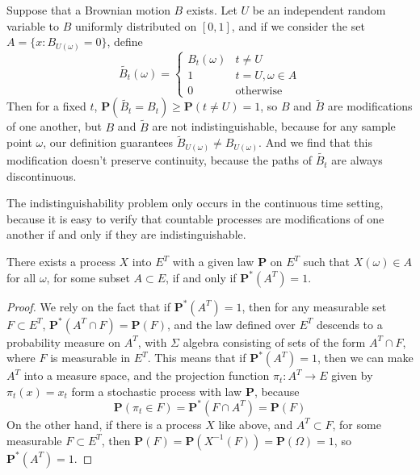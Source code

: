 \begin{example}
    Suppose that a Brownian motion $B$ exists. Let $U$ be an independent random variable to $B$ uniformly distributed on $[0,1]$, and if we consider the set $A = \{ x : B_{U(\omega)} = 0 \}$, define
    \[ \tilde{B_t}(\omega) = \begin{cases} B_t(\omega) & t \neq U \\ 1 & t = U, \omega \in A \\ 0 & \text{otherwise} \end{cases} \]
    Then for a fixed $t$, $\mathbf{P}(\tilde{B_t} = B_t) \geq \mathbf{P}(t \neq U) = 1$, so $B$ and $\tilde{B}$ are modifications of one another, but $B$ and $\tilde{B}$ are not indistinguishable, because for any sample point $\omega$, our definition guarantees $\tilde{B}_{U(\omega)} \neq B_{U(\omega)}$. And we find that this modification doesn't preserve continuity, because the paths of $\tilde{B_t}$ are always discontinuous.
\end{example}

The indistinguishability problem only occurs in the continuous time setting, because it is easy to verify that countable processes are modifications of one another if and only if they are indistinguishable.

\begin{lemma}
    There exists a process $X$ into $E^T$ with a given law $\mathbf{P}$ on $E^T$ such that $X(\omega) \in A$ for all $\omega$, for some subset $A \subset E$, if and only if $\mathbf{P}^*(A^T) = 1$.
\end{lemma}
\begin{proof}
    We rely on the fact that if $\mathbf{P}^*(A^T) = 1$, then for any measurable set $F \subset E^T$, $\mathbf{P}^*(A^T \cap F) = \mathbf{P}(F)$, and the law defined over $E^T$ descends to a probability measure on $A^T$, with $\Sigma$ algebra consisting of sets of the form $A^T \cap F$, where $F$ is measurable in $E^T$. This means that if $\mathbf{P}^*(A^T) = 1$, then we can make $A^T$ into a measure space, and the projection function $\pi_t: A^T \to E$ given by $\pi_t(x) = x_t$ form a stochastic process with law $\mathbf{P}$, because
    \[ \mathbf{P}(\pi_t \in F) = \mathbf{P}^*(F \cap A^T) = \mathbf{P}(F) \]
    On the other hand, if there is a process $X$ like above, and $A^T \subset F$, for some measurable $F \subset E^T$, then $\mathbf{P}(F) = \mathbf{P}(X^{-1}(F)) = \mathbf{P}(\Omega) = 1$, so $\mathbf{P}^*(A^T) = 1$.
\end{proof}


